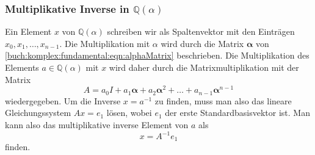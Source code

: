 \subsubsection{Multiplikative Inverse in $\mathbb{Q}(\alpha)$}
Ein Element $x$ von $\mathbb{Q}(\alpha)$ schreiben wir als Spaltenvektor mit
den Einträgen $x_0,x_1,\dots,x_{n-1}$.
Die Multiplikation mit $\alpha$ wird durch die Matrix $\bm{\alpha}$ von
\eqref{buch:komplex:fundamental:eqn:alphaMatrix} beschrieben.
Die Multiplikation des Elements $a\in \mathbb{Q}(\alpha)$ mit $x$ wird
daher durch die Matrixmultiplikation mit der Matrix
\[
A
=
a_0I+a_1\bm{\alpha} + a_2\bm{\alpha}^2 + \ldots + a_{n-1}\bm{\alpha}^{n-1}
\]
wiedergegeben.
Um die Inverse $x=a^{-1}$ zu finden, muss man also das lineare
Gleichungssystem
%
$ Ax=e_1 $ lösen, wobei $e_1$ der erste Standardbasisvektor ist.
%
Man kann also das multiplikative inverse Element von $a$ als
%
%
\[
x = A^{-1}e_1
\]
finden.

%
%

